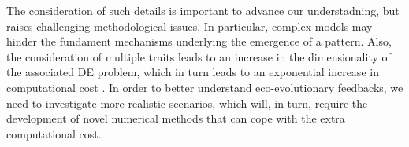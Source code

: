 % 
% 
The consideration of such details is important to advance our understadning, but raises challenging methodological issues. 
% 
In particular, complex models may hinder the fundament mechanisms underlying the emergence of a pattern.
% 
Also, the consideration of multiple traits leads to an increase in the dimensionality of the associated DE problem, which in turn leads to an exponential increase in computational cost \cite{XXX}.
% 
In order to better understand eco-evolutionary feedbacks, we need to investigate more realistic scenarios, which will, in turn, require the development of novel numerical methods that can cope with the extra computational cost.
% 


